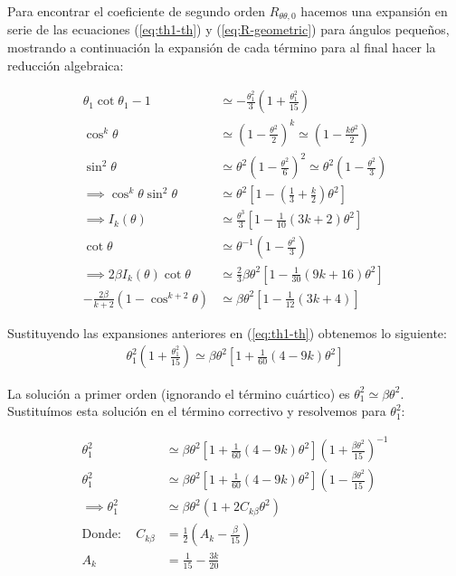 Para encontrar el coeficiente de segundo orden $R_{\theta \theta, 0}$ hacemos una expansión en serie de las ecuaciones (\ref{eq:th1-th}) y
(\ref{eq:R-geometric}) para ángulos pequeños, mostrando a continuación la expansión de cada término para al final hacer la
reducción algebraica:

\begin{align}
  \theta_1\cot\theta_1 -1 &\simeq -\frac{\theta^2_1}{3}\left(1 + \frac{\theta^2_1}{15}\right) \\
  \cos^k\theta &\simeq \left(1 - \frac{\theta^2}{2}\right)^k \simeq \left(1 - \frac{k\theta^2}{2}\right) \\
  \sin^2\theta &\simeq \theta^2\left(1 - \frac{\theta^2}{6}\right)^2 \simeq \theta^2\left(1 - \frac{\theta^2}{3}\right)\\
  \implies \cos^k\theta\sin^2\theta &\simeq \theta^2\left[1 - \left(\frac{1}{3} + \frac{k}{2}\right)\theta^2\right] \\
  \implies I_k(\theta) &\simeq \frac{\theta^3}{3}\left[1 - \frac{1}{10}\left(3k + 2\right)\theta^2\right] \\
  \cot\theta &\simeq \theta^{-1}\left(1 - \frac{\theta^2}{3}\right) \\
  \implies 2\beta I_k(\theta)\cot\theta &\simeq \frac{2}{3}\beta\theta^2\left[1 - \frac{1}{30}\left(9k + 16\right)\theta^2\right] \\
  -\frac{2\beta}{k+2}\left(1 - \cos^{k+2}\theta\right) &\simeq \beta\theta^2\left[1 - \frac{1}{12}\left(3k+4\right)\right]
\end{align}

Sustituyendo las expansiones anteriores en (\ref{eq:th1-th}) obtenemos lo siguiente:
\begin{align}
  \theta^2_1\left(1 + \frac{\theta^2_1}{15}\right) \simeq \beta\theta^2\left[1 + \frac{1}{60}\left(4 - 9k\right)\theta^2\right]
  \label{eq:th1-th-approx}
\end{align}

La solución a primer orden (ignorando el término cuártico) es $\theta^2_ 1 \simeq \beta\theta^2$. Sustituímos esta solución en el
término correctivo y resolvemos para $\theta^2_1$:

\begin{align}
  \theta^2_1 &\simeq \beta\theta^2\left[1 + \frac{1}{60}\left(4 - 9k\right)\theta^2\right]\left(1 + \frac{\beta\theta^2}{15}\right)^{-1} \\
  \theta^2_1 &\simeq \beta\theta^2\left[1 + \frac{1}{60}\left(4 - 9k\right)\theta^2\right]\left(1 - \frac{\beta\theta^2}{15}\right) \\
  \implies \theta^2_1 &\simeq \beta\theta^2\left(1 + 2C_{k\beta}\theta^2\right) \\
  \mathrm{Donde:\quad}C_{k\beta} &= \frac{1}{2}\left(A_k - \frac{\beta}{15}\right) \\
  A_k &= \frac{1}{15} - \frac{3k}{20}
\end{align}

